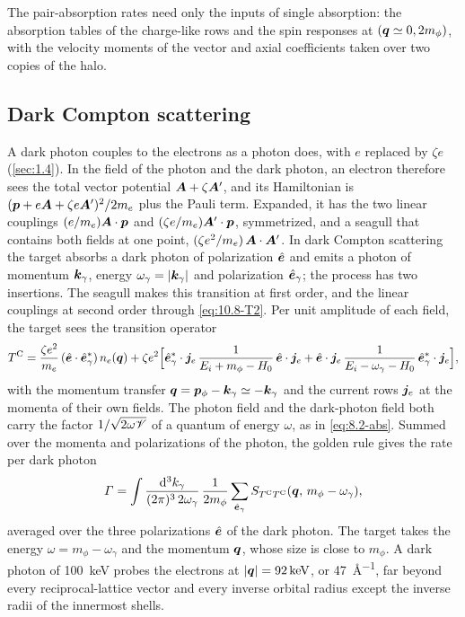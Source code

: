 The pair-absorption rates need only the inputs of single absorption: the absorption tables of the charge-like rows and the spin responses at $(\bm{q} \simeq 0, 2m_\phi)$, with the velocity moments of the vector and axial coefficients taken over two copies of the halo.

\subsection{Dark Compton scattering}\label{sec:10.8-compton}

A dark photon couples to the electrons as a photon does, with $e$ replaced by $\zeta e$ (\cref{sec:1.4}). In the field of the photon and the dark photon, an electron therefore sees the total vector potential $\bm{A} + \zeta\bm{A}'$, and its Hamiltonian is $(\bm{p} + e\bm{A} + \zeta e\bm{A}')^2/2m_e$ plus the Pauli term. Expanded, it has the two linear couplings $(e/m_e)\bm{A}\cdot\bm{p}$ and $(\zeta e/m_e)\bm{A}'\cdot\bm{p}$, symmetrized, and a seagull that contains both fields at one point, $(\zeta e^2/m_e)\,\bm{A}\cdot\bm{A}'$. In dark Compton scattering the target absorbs a dark photon of polarization $\hat{\bm{e}}$ and emits a photon of momentum $\bm{k}_\gamma$, energy $\omega_\gamma = |\bm{k}_\gamma|$ and polarization $\hat{\bm{e}}_\gamma$; the process has two insertions. The seagull makes this transition at first order, and the linear couplings at second order through \cref{eq:10.8-T2}. Per unit amplitude of each field, the target sees the transition operator
\begin{equation}
  T^{\mathrm{C}} = \frac{\zeta e^2}{m_e}\,(\hat{\bm{e}}\cdot\hat{\bm{e}}_\gamma^*)\,n_e(\bm{q})
  + \zeta e^2\Bigl[\hat{\bm{e}}_\gamma^*\cdot\bm{j}_e\,\frac{1}{E_i + m_\phi - H_0}\,\hat{\bm{e}}\cdot\bm{j}_e
  + \hat{\bm{e}}\cdot\bm{j}_e\,\frac{1}{E_i - \omega_\gamma - H_0}\,\hat{\bm{e}}_\gamma^*\cdot\bm{j}_e\Bigr] ,
  \label{eq:10.8-TC}
\end{equation}
with the momentum transfer $\bm{q} = \bm{p}_\phi - \bm{k}_\gamma \simeq -\bm{k}_\gamma$ and the current rows $\bm{j}_e$ at the momenta of their own fields. The photon field and the dark-photon field both carry the factor $1/\sqrt{2\omega \mathscr{V}}$ of a quantum of energy $\omega$, as in \cref{eq:8.2-abs}. Summed over the momenta and polarizations of the photon, the golden rule gives the rate per dark photon
\begin{equation}
  \varGamma = \int\frac{\mathrm{d}^3k_\gamma}{(2\pi)^3\,2\omega_\gamma}\,\frac{1}{2m_\phi}\sum_{\hat{\bm{e}}_\gamma}S_{T^{\mathrm{C}}T^{\mathrm{C}}}(\bm{q},\, m_\phi - \omega_\gamma) ,
  \label{eq:10.8-CS}
\end{equation}
averaged over the three polarizations $\hat{\bm{e}}$ of the dark photon. The target takes the energy $\omega = m_\phi - \omega_\gamma$ and the momentum $\bm{q}$, whose size is close to $m_\phi$. A dark photon of \SI{100}{keV} probes the electrons at $|\bm{q}| = \SI{92}{keV}$, or \SI{47}{\angstrom^{-1}}, far beyond every reciprocal-lattice vector and every inverse orbital radius except the inverse radii of the innermost shells.

